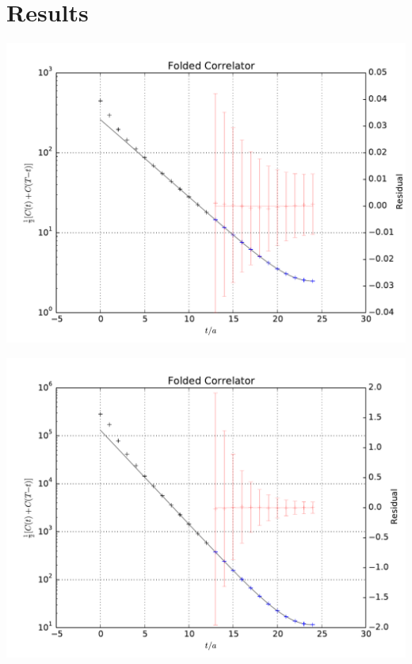 \documentclass[english, fleqn]{beamer}
\begin{document}

\section{Results}


\begin{frame}
    \begin{centering}
        \includegraphics[height=\textheight]{plots/A100_24_L24_T48_beta190_mul0100_musig150_mudel190_kappa1632550__ev120__TB2_SO_LI6_new_c2_folded.pdf}
    \end{centering}
\end{frame}

\begin{frame}
    \begin{centering}
        \includegraphics[height=\textheight]{plots/A100_24_L24_T48_beta190_mul0100_musig150_mudel190_kappa1632550__ev120__TB2_SO_LI6_new_c4_folded.pdf}
    \end{centering}
\end{frame}
\end{document}
